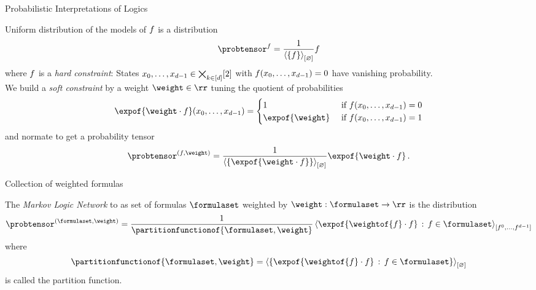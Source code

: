 \documentclass{beamer}
\begin{document}
\begin{frame}{Probabilistic Interpretations of Logics}

Uniform distribution of the models of $f$ is a distribution
\begin{align*}
	\probtensor^{\exformula} = \frac{1}{\contractionof{\{\exformula\}}{\varnothing}} \exformula
\end{align*}
where $f$ is a \emph{hard constraint}: 
States ${x_{0},\ldots,x_{d-1}}\in\bigtimes_{k\in[d]}[2]$ with $f({x_{0},\ldots,x_{d-1}})=0$ have vanishing probability. \\
\medskip
We build a \emph{soft constraint} by a weight $\weight\in\rr$ tuning the quotient of probabilities 
\begin{align*}
	\expof{\weight \cdot \exformula}(\atomindices) = \begin{cases}
	1 & \text{  if  } \exformula(\atomindices) = 0 \\
	\expof{\weight} &  \text{  if  } \exformula(\atomindices) = 1 \\
	\end{cases}
\end{align*}
and normate to get a probability tensor
\begin{align*}
	\probtensor^{(\exformula,\weight)} = \frac{1}{\contractionof{\{\expof{\weight\cdot \exformula}\}}{\varnothing}} \expof{\weight\cdot\exformula} \, .
\end{align*}

\end{frame}



\begin{frame}{Collection of weighted formulas}

\begin{definition}
	The \emph{Markov Logic Network} to as set of formulas $\formulaset$ weighted by $\weight: \formulaset \rightarrow \rr$ is the distribution
	\begin{align*}
		\probtensor^{(\formulaset, \weight)} = \frac{1}{\partitionfunctionof{\formulaset,\weight}}
		\contractionof{\expof{\weightof{\exformula}\cdot \exformula} \, : \, \exformulain}{\enumeratedatoms}
	\end{align*}
	where
	\begin{align*}
		\partitionfunctionof{\formulaset,\weight} = \contractionof{\left\{\expof{\weightof{\exformula}\cdot \exformula} \, : \, \exformulain\right\}}{\varnothing}
	\end{align*}
	is called the partition function.
\end{definition}

\end{frame}
\end{document}
